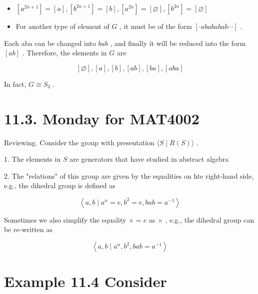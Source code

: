\begin{itemize}
\item \(\left\lbrack  {a}^{{2n} + 1}\right\rbrack   = \left\lbrack  a\right\rbrack  ,\left\lbrack  {b}^{{2n} + 1}\right\rbrack   = \left\lbrack  b\right\rbrack  ,\left\lbrack  {a}^{2n}\right\rbrack   = \left\lbrack  \varnothing \right\rbrack  ,\left\lbrack  {b}^{2n}\right\rbrack   = \left\lbrack  \varnothing \right\rbrack\)
\end{itemize}

\begin{itemize}
\item For another type of element of \(G\) , it must be of the form \(\left\lbrack  {\cdot {abababab}\cdots }\right\rbrack\) .
\end{itemize}

Each aba can be changed into \({bab}\) , and finally it will be reduced into the form \(\left\lbrack  {ab}\right\rbrack\) . Therefore, the elements in \(G\) are

\[
\left\lbrack  \varnothing \right\rbrack  ,\left\lbrack  a\right\rbrack  ,\left\lbrack  b\right\rbrack  ,\left\lbrack  {ab}\right\rbrack  ,\left\lbrack  {ba}\right\rbrack  ,\left\lbrack  {aba}\right\rbrack
\]

In fact, \(G \cong  {S}_{3}\) .

\section*{11.3. Monday for MAT4002}

Reviewing. Consider the group with presentation \(\langle S \mid  R\left( S\right) \rangle\) .

1. The elements in \(S\) are generators that have studied in abstract algebra

2. The "relations" of this group are given by the equalities on hte right-hand side, e.g., the dihedral group is defined as

\[
\left\langle  {a,b \mid  {a}^{n} = e,{b}^{2} = e,{bab} = {a}^{-1}}\right\rangle
\]

Sometimes we also simplify the equality \(\times   = e\) as \(\times\) , e.g., the dihedral group can be re-written as

\[
\left\langle  {a,b \mid  {a}^{n},{b}^{2},{bab} = {a}^{-1}}\right\rangle
\]

\section*{Example 11.4 Consider}

